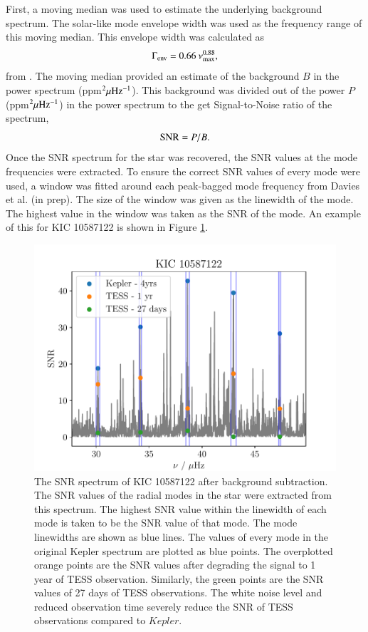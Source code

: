 \documentclass[a4paper,fleqn,usenatbib,useAMS]{mnras}
\newcommand{\numax}{\ensuremath{\nu_{\textrm{max}}}}
\newcommand{\kep}{\ensuremath{Kepler}\:}
\begin{document}
First, a moving median was used to estimate the underlying background spectrum. The solar-like mode envelope width was used as the frequency range of this moving median. This envelope width was calculated as
\begin{equation}
\Gamma_{\rm env} = 0.66 \: \numax^{0.88},
\end{equation}
from \citet{mosser_characterization_2012}. The moving median provided an estimate of the background $B$ in the power spectrum (ppm$^{2} \mu\rm Hz^{-1}$). This background was divided out of the power $P$ (ppm$^{2} \mu\rm Hz^{-1}$) in the power spectrum to the get Signal-to-Noise ratio of the spectrum,
\begin{equation}
\label{eq:snr}
{\rm SNR} = P/B.
\end{equation}
Once the SNR spectrum for the star was recovered, the SNR values at the mode frequencies were extracted. To ensure the correct SNR values of every mode were used, a window was fitted around each peak-bagged mode frequency from Davies et al. (in prep). The size of the window was given as the linewidth of the mode. The highest value in the window was taken as the SNR of the mode. An example of this for KIC 10587122 is shown in Figure \ref{snr}.
\begin{figure}
	\centering
	\includegraphics[scale=0.5]{plot4_SNR10587122.pdf}
	\caption{The SNR spectrum of KIC 10587122 after background subtraction. The SNR values of the radial modes in the star were extracted from this spectrum. The highest SNR value within the linewidth of each mode is taken to be the SNR value of that mode. The mode linewidths are shown as blue lines. The values of every mode in the original Kepler spectrum are plotted as blue points. The overplotted orange points are the SNR values after degrading the signal to 1 year of TESS observation. Similarly, the green points are the SNR values of 27 days of TESS observations. The white noise level and reduced observation time severely reduce the SNR of TESS observations compared to \kep.}	
	\label{snr}
\end{figure}
\end{document}
